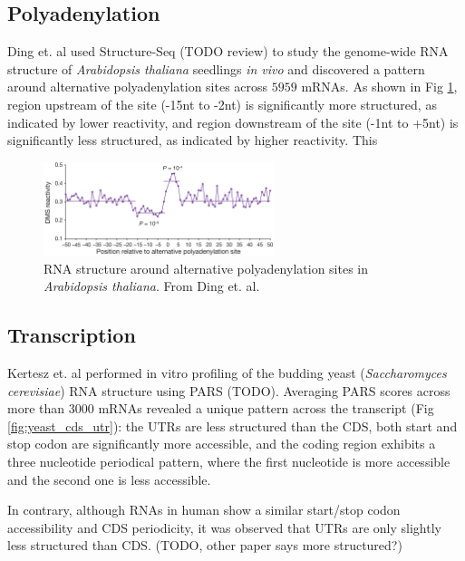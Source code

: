 \documentclass{proposal}
\begin{document}
\subsection*{Polyadenylation}

Ding et. al\cite{ding2014vivo} used Structure-Seq (TODO review) to study the genome-wide RNA structure of
﻿\textit{Arabidopsis thaliana} seedlings \textit{in vivo} and discovered a pattern around alternative polyadenylation sites across $5959$ mRNAs.
As shown in Fig \ref{fig:poly_a}, region upstream of the site (-15nt to -2nt) is significantly more structured, as indicated by lower reactivity,
and region downstream of the site (-1nt to +5nt) is significantly less structured, as indicated by higher reactivity.
This

\begin{figure}[h!]
    \centering
    \includegraphics[width=0.6\textwidth]{poly_a.png}
    \caption{RNA structure around alternative polyadenylation sites in ﻿\textit{Arabidopsis thaliana}. From Ding et. al\cite{ding2014vivo}.}
    \label{fig:poly_a}
    \centering
\end{figure}


\subsection*{Transcription}

Kertesz et. al\cite{kertesz2010genome} performed in vitro profiling of ﻿the budding yeast
(\textit{Saccharomyces cerevisiae}) RNA structure using PARS (TODO).
Averaging PARS scores across more than $3000$ mRNAs revealed a unique pattern across the transcript (Fig \ref{fig:yeast_cds_utr}):
 the UTRs are less structured than the CDS, both start and stop codon are significantly more accessible,
and the coding region exhibits a three nucleotide periodical pattern,
where the first nucleotide is more accessible and the second one is less accessible.

In contrary, although RNAs in human show a similar start/stop codon accessibility and CDS periodicity,
it was observed that UTRs are only slightly less structured than CDS\cite{wan2014landscape}.  (TODO, other paper says more structured?)
\end{document}
